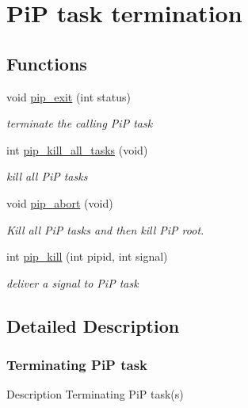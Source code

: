 \hypertarget{group__PiP-5-exit}{\section{Pi\-P task termination}
\label{group__PiP-5-exit}
}
\subsection*{Functions}
\begin{DoxyCompactItemize}
\item 
void \hyperlink{group__PiP-5-exit_ga55171ea8db2c2693f005560e427485c2}{pip\-\_\-exit} (int status)
\begin{DoxyCompactList}\small\item\em terminate the calling Pi\-P task \end{DoxyCompactList}\item 
int \hyperlink{group__PiP-5-exit_gab7ba5cc62101240c68acf07905e36772}{pip\-\_\-kill\-\_\-all\-\_\-tasks} (void)
\begin{DoxyCompactList}\small\item\em kill all Pi\-P tasks \end{DoxyCompactList}\item 
void \hyperlink{group__PiP-5-exit_ga49a4a9ee014ffdaf0c26df18adf965ad}{pip\-\_\-abort} (void)
\begin{DoxyCompactList}\small\item\em Kill all Pi\-P tasks and then kill Pi\-P root. \end{DoxyCompactList}\item 
int \hyperlink{group__PiP-5-exit_ga4a396f38920d94b71dcfd3c898fbb82b}{pip\-\_\-kill} (int pipid, int signal)
\begin{DoxyCompactList}\small\item\em deliver a signal to Pi\-P task \end{DoxyCompactList}\end{DoxyCompactItemize}


\subsection{Detailed Description}
\hypertarget{pip-exit}{}\subsubsection{Terminating Pi\-P task}\label{pip-exit}
\begin{DoxyParagraph}{Description}
Terminating Pi\-P task(s) 
\end{DoxyParagraph}


